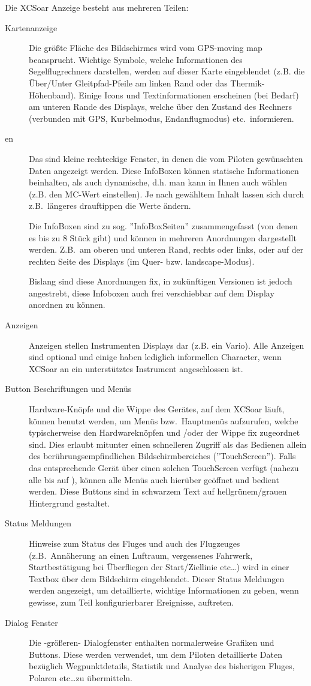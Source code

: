 Die  \textsf{XCSoar} Anzeige besteht aus mehreren Teilen:
\begin{description}
\item[Kartenanzeige] Die größte Fläche des Bildschirmes wird vom GPS-moving map beansprucht.
Wichtige Symbole, welche Informationen des Segelflugrechners darstellen, werden auf dieser Karte
eingeblendet (z.B. die Über/Unter Gleitpfad-Pfeile am linken Rand oder das Thermik-Höhenband).
Einige Icons und Textinformationen  erscheinen  (bei Bedarf) am unteren Rande des Displays,
welche über den Zustand des Rechners (verbunden mit GPS, Kurbelmodus, Endanflugmodus) etc.\  informieren.
%
\item[{\InfoBox}en] Das sind kleine rechteckige Fenster, in denen die vom Piloten gewünschten Daten angezeigt werden. Diese InfoBoxen können statische Informationen beinhalten, als auch dynamische, d.h. man kann in Ihnen auch wählen (z.B. den MC-Wert einstellen). Je nach gewähltem Inhalt lassen sich durch z.B.\ längeres drauftippen die Werte ändern. 

Die InfoBoxen sind zu sog. ''InfoBoxSeiten'' zusammengefasst (von denen es bis zu 8 Stück  gibt)  und können in mehreren Anordnungen dargestellt werden. Z.B.\ am oberen und unteren Rand, rechts oder links, oder auf der rechten Seite des Displays (im Quer- bzw. landscape-Modus). 

Bislang sind diese Anordnungen fix, in zukünftigen Versionen ist jedoch angestrebt, diese Infoboxen auch frei verschiebbar auf dem Display anordnen zu können.
%
\item[Anzeigen] Anzeigen stellen Instrumenten Displays dar (z.B. ein Vario). Alle Anzeigen sind optional und einige
haben lediglich informellen  Character, wenn \textsf{XCSoar} an ein unterstütztes Instrument angeschlossen ist.
%
\item[Button Beschriftungen und Menüs] Hardware-Knöpfe und die Wippe des Gerätes, auf dem \textsf{XCSoar} läuft, können benutzt werden, um Menüs bzw.\ Hauptmenüs aufzurufen, welche typischerweise den Hardwareknöpfen und /oder der Wippe fix zugeordnet sind. Dies erlaubt mitunter einen schnelleren Zugriff als das Bedienen allein des berührungsempfindlichen Bildschirmbereiches (''TouchScreen'').
Falls das entsprechende Gerät über einen solchen TouchScreen verfügt (nahezu alle bis auf \al), können alle Menüs auch
hierüber geöffnet und bedient werden. Diese Buttons sind in schwarzem Text auf hellgrünem/grauen Hintergrund gestaltet.
%
\item[Status Meldungen] Hinweise zum Status des Fluges und auch des Flugzeuges  (z.B.\ Annäherung an einen Luftraum, vergessenes Fahrwerk, Startbestätigung bei Überfliegen der Start/Ziellinie etc\dots ) wird in einer Textbox  über dem Bildschirm eingeblendet.
Dieser Status Meldungen werden angezeigt, um detaillierte, wichtige Informationen zu geben, wenn gewisse, zum Teil konfigurierbarer Ereignisse, auftreten.
%
\item[Dialog Fenster] Die -größeren- Dialogfenster enthalten normalerweise Grafiken und Buttons. Diese werden verwendet, um dem Piloten  detaillierte Daten bezüglich Wegpunktdetails, Statistik und Analyse des bisherigen Fluges, Polaren etc\dots  zu übermitteln.


\end{description}
